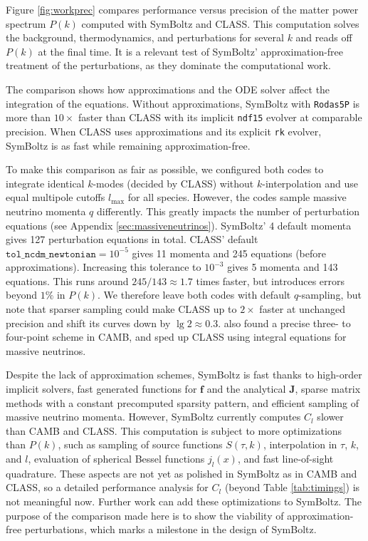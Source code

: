 \documentclass{aa}
\newcommand\lmax{l_\text{max}}
\begin{document}
Figure \ref{fig:workprec} compares performance versus precision of the matter power spectrum $P(k)$ computed with SymBoltz and CLASS.
This computation solves the background, thermodynamics, and perturbations for several $k$ and reads off $P(k)$ at the final time.
It is a relevant test of SymBoltz' approximation-free treatment of the perturbations, as they dominate the computational work.

The comparison shows how approximations and the ODE solver affect the integration of the equations.
Without approximations, SymBoltz with \texttt{Rodas5P} is more than $10\times$ faster than CLASS with its implicit \texttt{ndf15} evolver at comparable precision.
When CLASS uses approximations and its explicit \texttt{rk} evolver, SymBoltz is as fast while remaining approximation-free.

To make this comparison as fair as possible, we configured both codes to integrate identical $k$-modes (decided by CLASS) without $k$-interpolation and use equal multipole cutoffs $\lmax$ for all species.
However, the codes sample massive neutrino momenta $q$ differently.
This greatly impacts the number of perturbation equations (see Appendix \ref{sec:massiveneutrinos}).
SymBoltz' 4 default momenta gives 127 perturbation equations in total.
CLASS' default $\texttt{tol\_ncdm\_newtonian} = 10^{-5}$ gives 11 momenta and 245 equations (before approximations).
Increasing this tolerance to $10^{-3}$ gives 5 momenta and 143 equations.
This runs around $245/143 \approx 1.7$ times faster, but introduces errors beyond $1\%$ in $P(k)$.
We therefore leave both codes with default $q$-sampling, but note that sparser sampling could make CLASS up to $2\times$ faster at unchanged precision
and shift its curves down by $\lg 2 \approx 0.3$.
\citet[in Appendix A]{howlettCMBPowerSpectrum2012} also found a precise three- to four-point scheme in CAMB,
and \citet{leeRapidAccurateNumerical2025} sped up CLASS using integral equations for massive neutrinos.

Despite the lack of approximation schemes, SymBoltz is fast thanks to
high-order implicit solvers,
fast generated functions for $\boldsymbol{f}$ and the analytical $\boldsymbol{J}$,
sparse matrix methods with a constant precomputed sparsity pattern,
and efficient sampling of massive neutrino momenta.
However, SymBoltz currently computes $C_l$ slower than CAMB and CLASS.
This computation is subject to more optimizations than $P(k)$, such as sampling of source functions $S(\tau,k)$, interpolation in $\tau$, $k$, and $l$, evaluation of spherical Bessel functions $j_l(x)$, and fast line-of-sight quadrature.
These aspects are not yet as polished in SymBoltz as in CAMB and CLASS, so a detailed performance analysis for $C_l$ (beyond Table \ref{tab:timings}) is not meaningful now.
Further work can add these optimizations to SymBoltz.
The purpose of the comparison made here is to show the viability of approximation-free perturbations, which marks a milestone in the design of SymBoltz.
\end{document}
